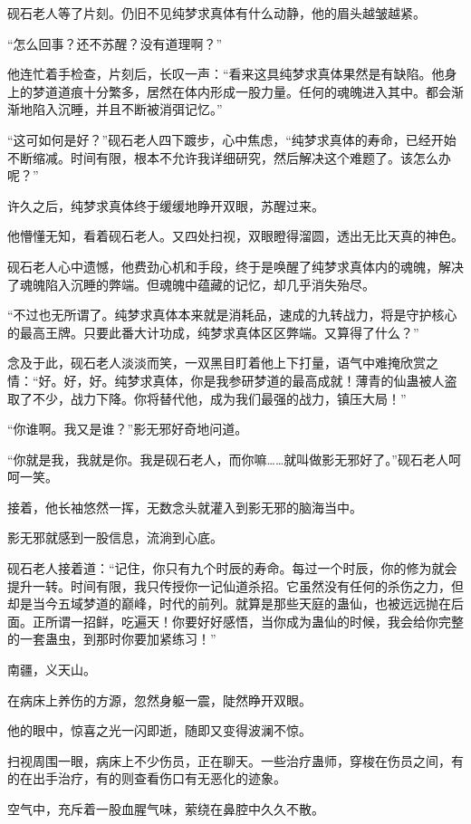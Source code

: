 \begin{this_body}
砚石老人等了片刻。仍旧不见纯梦求真体有什么动静，他的眉头越皱越紧。

“怎么回事？还不苏醒？没有道理啊？”

他连忙着手检查，片刻后，长叹一声：“看来这具纯梦求真体果然是有缺陷。他身上的梦道道痕十分繁多，居然在体内形成一股力量。任何的魂魄进入其中。都会渐渐地陷入沉睡，并且不断被消弭记忆。”

“这可如何是好？”砚石老人四下踱步，心中焦虑，“纯梦求真体的寿命，已经开始不断缩减。时间有限，根本不允许我详细研究，然后解决这个难题了。该怎么办呢？”

许久之后，纯梦求真体终于缓缓地睁开双眼，苏醒过来。

他懵懂无知，看着砚石老人。又四处扫视，双眼瞪得溜圆，透出无比天真的神色。

砚石老人心中遗憾，他费劲心机和手段，终于是唤醒了纯梦求真体内的魂魄，解决了魂魄陷入沉睡的弊端。但魂魄中蕴藏的记忆，却几乎消失殆尽。

“不过也无所谓了。纯梦求真体本来就是消耗品，速成的九转战力，将是守护核心的最高王牌。只要此番大计功成，纯梦求真体区区弊端。又算得了什么？”

念及于此，砚石老人淡淡而笑，一双黑目盯着他上下打量，语气中难掩欣赏之情：“好。好，好。纯梦求真体，你是我参研梦道的最高成就！薄青的仙蛊被人盗取了不少，战力下降。你将替代他，成为我们最强的战力，镇压大局！”

“你谁啊。我又是谁？”影无邪好奇地问道。

“你就是我，我就是你。我是砚石老人，而你嘛……就叫做影无邪好了。”砚石老人呵呵一笑。

接着，他长袖悠然一挥，无数念头就灌入到影无邪的脑海当中。

影无邪就感到一股信息，流淌到心底。

砚石老人接着道：“记住，你只有九个时辰的寿命。每过一个时辰，你的修为就会提升一转。时间有限，我只传授你一记仙道杀招。它虽然没有任何的杀伤之力，但却是当今五域梦道的巅峰，时代的前列。就算是那些天庭的蛊仙，也被远远抛在后面。正所谓一招鲜，吃遍天！你要好好感悟，当你成为蛊仙的时候，我会给你完整的一套蛊虫，到那时你要加紧练习！”

南疆，义天山。

在病床上养伤的方源，忽然身躯一震，陡然睁开双眼。

他的眼中，惊喜之光一闪即逝，随即又变得波澜不惊。

扫视周围一眼，病床上不少伤员，正在聊天。一些治疗蛊师，穿梭在伤员之间，有的在出手治疗，有的则查看伤口有无恶化的迹象。

空气中，充斥着一股血腥气味，萦绕在鼻腔中久久不散。


\end{this_body}
